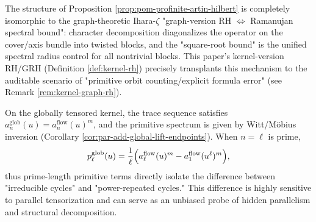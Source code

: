 \begin{remark}\label{rem:pom-profinite-ihara-ramanujan}
The structure of Proposition \ref{prop:pom-profinite-artin-hilbert} is completely isomorphic to the graph-theoretic Ihara-\(\zeta\) "graph-version RH \(\Leftrightarrow\) Ramanujan spectral bound":
character decomposition diagonalizes the operator on the cover/axis bundle into twisted blocks, and the "square-root bound" is the unified spectral radius control for all nontrivial blocks.
This paper's kernel-version RH/GRH (Definition \ref{def:kernel-rh}) precisely transplants this mechanism to the auditable scenario of "primitive orbit counting/explicit formula error" (see Remark \ref{rem:kernel-graph-rh}).
\end{remark}

\begin{remark}\label{rem:pom-prime-length-probe}
On the globally tensored kernel, the trace sequence satisfies $a_n^{\mathrm{glob}}(u)=a_n^{\mathrm{flow}}(u)^m$, and the primitive spectrum is given by Witt/Möbius inversion (Corollary \ref{cor:par-add-global-lift-endpoints}). When $n=\ell$ is prime,
\[
p_\ell^{\mathrm{glob}}(u)=\frac{1}{\ell}\Bigl(a_\ell^{\mathrm{flow}}(u)^m-a_1^{\mathrm{flow}}(u^\ell)^m\Bigr),
\]
thus prime-length primitive terms directly isolate the difference between "irreducible cycles" and "power-repeated cycles." This difference is highly sensitive to parallel tensorization and can serve as an unbiased probe of hidden parallelism and structural decomposition.
\end{remark}

